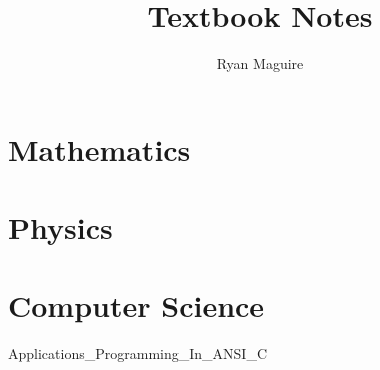 \documentclass[crop=false,class=book,oneside]{standalone}
\title{Textbook Notes}
\author{Ryan Maguire}
\date{\vspace{-5ex}}
\begin{document}
\part{Mathematics}
\part{Physics}
\part{Computer Science}
{%
    Applications_Programming_In_ANSI_C
}
\end{document}

